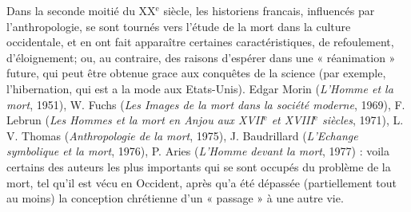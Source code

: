 Dans la seconde moitié du {\footnotesize XX}${^\text{e}}$ siècle, les historiens francais, influencés par l'anthropologie, se sont tournés vers l'étude de la mort dans la culture occidentale, et en ont fait apparaître certaines caractéristiques, de refoulement, d'éloignement; ou, au contraire, des raisons d'espérer dans une « réanimation » future, qui peut être obtenue grace aux conquêtes de la science (par exemple, l'hibernation, qui est a la mode aux Etats-Unis). Edgar Morin ({\it L'Homme et la mort}, 1951), W. Fuchs ({\it Les Images de la mort dans la société moderne}, 1969), F. Lebrun ({\it Les Hommes et la mort en Anjou aux {\footnotesize XVII\;}${^\text{e}}$ et {\footnotesize XVIII\;}${^\text{e}}$ siècles}, 1971), L. V. Thomas ({\it Anthropologie de la mort}, 1975), J. Baudrillard ({\it L'Echange symbolique et la mort}, 1976), P. Aries ({\it L'Homme devant la mort}, 1977) : voila certains des auteurs les plus importants qui se sont occupés du problème de la mort, tel qu'il est vécu en
Occident, après qu'a été dépassée (partiellement tout au moins) la conception chrétienne d'un « passage » à une autre vie.


\begin{center}
\setlength{\fboxsep}{3mm}
\end{center}

